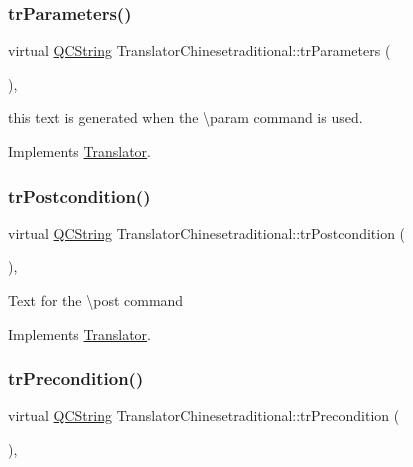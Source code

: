 \subsubsection{\texorpdfstring{trParameters()}{trParameters()}}
{\footnotesize\ttfamily virtual \mbox{\hyperlink{class_q_c_string}{Q\+C\+String}} Translator\+Chinesetraditional\+::tr\+Parameters (\begin{DoxyParamCaption}{ }\end{DoxyParamCaption})\hspace{0.3cm}{\ttfamily [inline]}, {\ttfamily [virtual]}}

this text is generated when the \textbackslash{}param command is used. 

Implements \mbox{\hyperlink{class_translator}{Translator}}.

\mbox{\label{class_translator_chinesetraditional_a6d6cb27072cc8f39c0013e0d43f745ae}} 
\subsubsection{\texorpdfstring{trPostcondition()}{trPostcondition()}}
{\footnotesize\ttfamily virtual \mbox{\hyperlink{class_q_c_string}{Q\+C\+String}} Translator\+Chinesetraditional\+::tr\+Postcondition (\begin{DoxyParamCaption}{ }\end{DoxyParamCaption})\hspace{0.3cm}{\ttfamily [inline]}, {\ttfamily [virtual]}}

Text for the \textbackslash{}post command 

Implements \mbox{\hyperlink{class_translator}{Translator}}.

\mbox{\label{class_translator_chinesetraditional_a938da32ab20e86e35800dc3782a87412}} 
\subsubsection{\texorpdfstring{trPrecondition()}{trPrecondition()}}
{\footnotesize\ttfamily virtual \mbox{\hyperlink{class_q_c_string}{Q\+C\+String}} Translator\+Chinesetraditional\+::tr\+Precondition (\begin{DoxyParamCaption}{ }\end{DoxyParamCaption})\hspace{0.3cm}{\ttfamily [inline]}, {\ttfamily [virtual]}}

